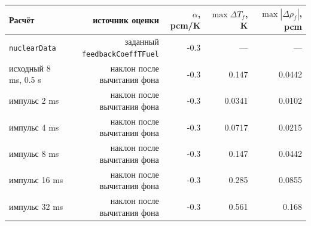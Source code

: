\begin{tabular}{lrrrr}
\hline
Расчёт & источник оценки & $\alpha$, pcm/K & $\max\Delta T_f$, K & $\max|\Delta\rho_f|$, pcm\\
\hline
\texttt{nuclearData} & заданный \texttt{feedbackCoeffTFuel} & -0.3 & --- & ---\\
исходный 8 ms, 0.5 s & наклон после вычитания фона & -0.3 & 0.147 & 0.0442\\
импульс 2 ms & наклон после вычитания фона & -0.3 & 0.0341 & 0.0102\\
импульс 4 ms & наклон после вычитания фона & -0.3 & 0.0717 & 0.0215\\
импульс 8 ms & наклон после вычитания фона & -0.3 & 0.147 & 0.0442\\
импульс 16 ms & наклон после вычитания фона & -0.3 & 0.285 & 0.0855\\
импульс 32 ms & наклон после вычитания фона & -0.3 & 0.561 & 0.168\\
\hline
\end{tabular}
